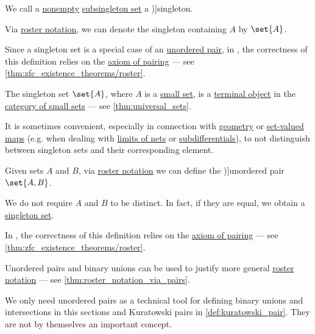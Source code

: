 \begin{definition}\label{def:singleton_set}
  We call a \hyperref[def:empty_set]{nonempty} \hyperref[def:singleton_set]{subsingleton set} a \term[ru=синглетон (\cite[129]{КолмогоровДрагалин2006ЛогикаВведение})]{singleton}.

  Via \hyperref[def:set_theory_definition/roster]{roster notation}, we can denote the singleton containing \( A \) by \( \set{ A } \).
\end{definition}
\begin{comments}
  \item Since a singleton set is a special case of an \hyperref[def:unordered_pair]{unordered pair}, in \hyperref[def:zfc]{}, the correctness of this definition relies on the \hyperref[def:zfc/pairing]{axiom of pairing} --- see \cref{thm:zfc_existence_theorems/roster}.

  \item The singleton set \( \set{ A } \), where \( A \) is a \hyperref[def:small_set]{small set}, is a \hyperref[def:universal_objects/terminal]{terminal object} in the \hyperref[def:category_of_small_sets]{category of small sets} --- see \cref{thm:universal_sets}.

  \item It is sometimes convenient, especially in connection with \hyperref[ch:geometry]{geometry} or \hyperref[def:function]{set-valued maps} (e.g. when dealing with \hyperref[def:net_limit_point]{limits of nets} or \hyperref[def:subdifferentials]{subdifferentials}), to not distinguish between singleton sets and their corresponding element.
\end{comments}

\begin{definition}\label{def:unordered_pair}
  Given sets \( A \) and \( B \), via \hyperref[def:set_theory_definition/roster]{roster notation} we can define the \term[ru=неупорядоченная пара (\cite[181]{Герасимов2014Вычислимость})]{unordered pair} \( \set{ A, B } \).

  We do not require \( A \) and \( B \) to be distinct. In fact, if they are equal, we obtain a \hyperref[def:singleton_set]{singleton set}.
\end{definition}
\begin{comments}
  \item In \hyperref[def:zfc]{}, the correctness of this definition relies on the \hyperref[def:zfc/pairing]{axiom of pairing} --- see \cref{thm:zfc_existence_theorems/roster}.

  \item Unordered pairs and binary unions can be used to justify more general \hyperref[def:set_theory_definition/roster]{roster notation} --- see \cref{thm:roster_notation_via_pairs}.

  \item We only need unordered pairs as a technical tool for defining binary unions and intersections in this sections and Kuratowski pairs in \cref{def:kuratowski_pair}. They are not by themselves an important concept.
\end{comments}

